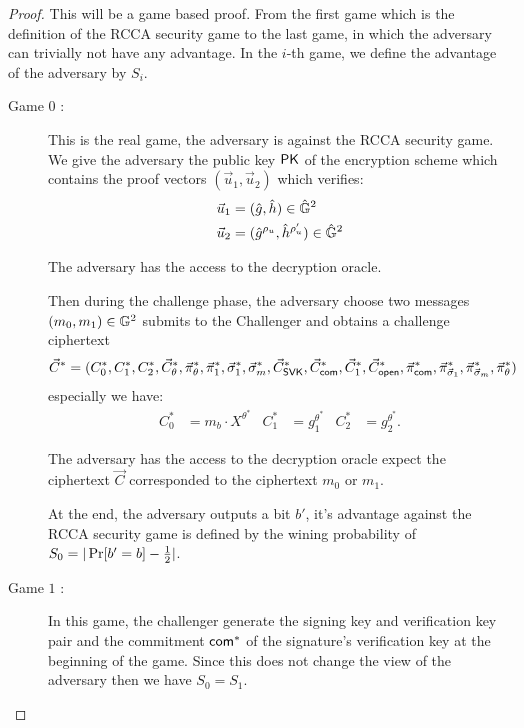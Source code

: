 \begin{proof}

  This will be a game based proof. From the first game which is the definition of the RCCA security game to the last game, in which the adversary can trivially not have any advantage. In the $i$-th game, we define the advantage of the adversary by $S_i$.

  \begin{description}
  \item[\textsf{Game} $0$ :] This is the real game, the adversary is against the RCCA security game. We give the adversary the public key $\mathsf{PK}$ of the encryption scheme which contains the proof vectors $(\vec{u}_1, \vec{u}_2)$ which verifies:
    \begin{align*}
      \vec{u}_1 &= (\hat{g}, \hat{h}) \in \hat{\mathbb{G}}^2\\
      \vec{u}_2 &= (\hat{g}^{\rho_u}, \hat{h}^{\rho_u'}) \in \hat{\mathbb{G}}^2
    \end{align*}

    The adversary has the access to the decryption oracle.
    
    Then during the challenge phase, the adversary choose two messages $(m_0, m_1) \in \mathbb{G}^2$ submits to the Challenger and obtains a challenge ciphertext
    \begin{align*}
      \vec{C}^* = (C_0^*, C_1^*, C_2^*, \vec{C}_{\theta}^*, \vec{\pi}_{\theta}^*, \vec{\pi}_{1}^*, \vec{\sigma}_1^*, \vec{\sigma}_m^*, \vec{C}_{\mathsf{SVK}}^*, \vec{C}_{\mathsf{com}}^*, \vec{C}_1^*, \vec{C}_{\mathsf{open}}^*, \vec{\pi}_{\mathsf{com}}^*, \vec{\pi}_{\vec{\sigma}_1}^*, \vec{\pi}_{\vec{\sigma}_m}^*, \vec{\pi}_{\theta}^*)
    \end{align*}
    especially we have:
    \begin{align*}
      C_0^* &= m_b \cdot X^{\theta^*} & C_1^* &= g_1^{\theta^*} & C_2^* &= g_2^{\theta^*}.
    \end{align*}

    The adversary has the access to the decryption oracle expect the ciphertext $\vec{C}$ corresponded to the ciphertext $m_0$ or $m_1$.

    At the end, the adversary outputs a bit $b'$, it's advantage against the RCCA security game is defined by the wining probability of $S_0 = |\operatorname{Pr}[b' = b] - \frac{1}{2}|$.

  \item[\textsf{Game} $1$ :] In this game, the challenger generate the signing key and verification key pair and the commitment $\mathsf{com}^*$ of the signature's verification key at the beginning of the game. Since this does not change the view of the adversary then we have $S_0 = S_1$.


\end{description}
\end{proof}
